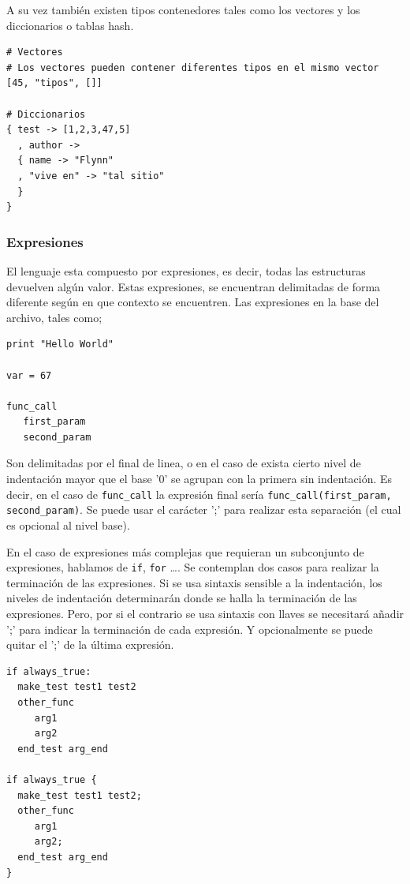 \documentclass[11pt]{article}
\begin{document}
A su vez también existen tipos contenedores tales como los vectores y los
diccionarios o tablas hash.

\begin{verbatim}
# Vectores
# Los vectores pueden contener diferentes tipos en el mismo vector
[45, "tipos", []]

# Diccionarios
{ test -> [1,2,3,47,5]
  , author ->
  { name -> "Flynn"
  , "vive en" -> "tal sitio"
  }
}

\end{verbatim}

\subsubsection{Expresiones}
\label{sec:org102eeb7}
El lenguaje esta compuesto por expresiones, es decir, todas las estructuras devuelven algún valor. Estas expresiones, se encuentran delimitadas de forma diferente según en que contexto
se encuentren.
Las expresiones en la base del archivo, tales como;
\begin{verbatim}
print "Hello World"

var = 67

func_call
   first_param
   second_param
\end{verbatim}

Son delimitadas por el final de linea, o en el caso de exista cierto nivel de indentación mayor que el base '0' se agrupan con la primera sin indentación. Es decir, en el caso de \texttt{func\_call}
la expresión final sería \texttt{func\_call(first\_param, second\_param)}. Se puede usar el carácter ';' para realizar esta separación (el cual es opcional al nivel base).

En el caso de expresiones más complejas que requieran un subconjunto de expresiones, hablamos de \texttt{if}, \texttt{for} \ldots{}. Se contemplan dos casos para realizar la terminación de las expresiones.
Si se usa sintaxis sensible a la indentación, los niveles de indentación
determinarán donde se halla la terminación de las expresiones. Pero,
por si el contrario se usa sintaxis con llaves
se necesitará añadir ';' para indicar la terminación de cada expresión. Y opcionalmente se puede quitar el ';' de la última expresión.

\begin{verbatim}
if always_true:
  make_test test1 test2
  other_func
     arg1
     arg2
  end_test arg_end

if always_true {
  make_test test1 test2;
  other_func
     arg1
     arg2;
  end_test arg_end
}
\end{verbatim}
\end{document}
